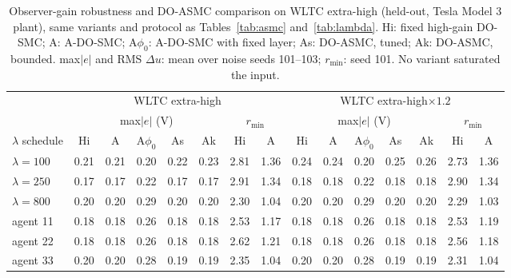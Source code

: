 \begin{table}[t]
\centering\footnotesize\setlength{\tabcolsep}{3.5pt}
\caption{Observer-gain robustness and DO-ASMC comparison on WLTC extra-high (held-out, Tesla Model 3 plant), same variants and protocol as Tables~\ref{tab:asmc} and~\ref{tab:lambda}. Hi: fixed high-gain DO-SMC; A: A-DO-SMC; A$\phi_0$: A-DO-SMC with fixed layer; As: DO-ASMC, tuned; Ak: DO-ASMC, bounded. max$|e|$ and RMS $\Delta u$: mean over noise seeds 101--103; $r_{\min}$: seed 101. No variant saturated the input.}
\label{tab:wltc}
\begin{tabular}{@{}lcccccccccccccc@{}}
\toprule
 & \multicolumn{7}{c}{WLTC extra-high} & \multicolumn{7}{c}{WLTC extra-high$\times1.2$}\\\cmidrule(lr){2-8}\cmidrule(lr){9-15}
 & \multicolumn{5}{c}{max$|e|$ (V)} & \multicolumn{2}{c}{$r_{\min}$} & \multicolumn{5}{c}{max$|e|$ (V)} & \multicolumn{2}{c}{$r_{\min}$}\\
$\lambda$ schedule & Hi & A & A$\phi_0$ & As & Ak & Hi & A & Hi & A & A$\phi_0$ & As & Ak & Hi & A\\
\midrule
$\lambda=100$ & 0.21 & 0.21 & 0.20 & 0.22 & 0.23 & 2.81 & 1.36 & 0.24 & 0.24 & 0.20 & 0.25 & 0.26 & 2.73 & 1.36\\
$\lambda=250$ & 0.17 & 0.17 & 0.22 & 0.17 & 0.17 & 2.91 & 1.34 & 0.18 & 0.18 & 0.22 & 0.18 & 0.18 & 2.90 & 1.34\\
$\lambda=800$ & 0.20 & 0.20 & 0.29 & 0.20 & 0.20 & 2.30 & 1.04 & 0.20 & 0.20 & 0.29 & 0.20 & 0.20 & 2.29 & 1.03\\
\midrule
agent 11 & 0.18 & 0.18 & 0.26 & 0.18 & 0.18 & 2.53 & 1.17 & 0.18 & 0.18 & 0.26 & 0.18 & 0.18 & 2.53 & 1.19\\
agent 22 & 0.18 & 0.18 & 0.26 & 0.18 & 0.18 & 2.62 & 1.21 & 0.18 & 0.18 & 0.26 & 0.18 & 0.18 & 2.56 & 1.18\\
agent 33 & 0.20 & 0.20 & 0.28 & 0.19 & 0.19 & 2.35 & 1.04 & 0.20 & 0.20 & 0.28 & 0.19 & 0.19 & 2.31 & 1.04\\
\bottomrule
\end{tabular}
\end{table}
